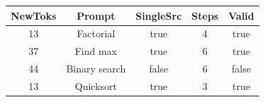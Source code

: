 \begin{table}[h]
\centering
\begin{tabular}{ |c|c|c|c|c| }
\hline
NewToks & Prompt & SingleSrc & Steps & Valid \\
\hline
13 & Factorial & true & 4 & true \\
\hline
37 & Find max & true & 6 & true \\
\hline
44 & Binary search & false & 6 & false \\
\hline
13 & Quicksort & true & 3 & true \\
\hline
\end{tabular}
\end{table}
